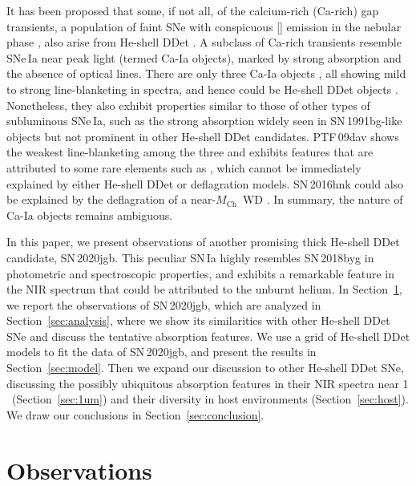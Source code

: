 \documentclass[twocolumn]{aastex631}
\newcommand{\sn}{SN\,2020jgb}
\newcommand{\Mch}{$M_\mathrm{Ch}$}
\begin{document}
It has been proposed that some, if not all, of the calcium-rich (Ca-rich) gap transients, a population of faint SNe with conspicuous [] emission in the nebular phase \citep{Filippenko_2003, Kasliwal_2012}, also arise from He-shell DDet \citep{Dessart_2015,de_Ca_rich_2020,polin_nebular_2021}. A subclass of Ca-rich transients resemble SNe\,Ia near peak light (termed Ca-Ia objects), marked by strong  absorption and the absence of optical  lines. There are only three Ca-Ia objects \citep[PTF\,09dav, SN\,2016hnk, and SN\,2019ofm;][]{de_Ca_rich_2020}, all showing mild to strong line-blanketing in spectra, and hence could be He-shell DDet objects \citep[e.g.,][]{jacobson-galan_16hnk_2020}. Nonetheless, they also exhibit properties similar to those of other types of subluminous SNe\,Ia, such as the strong  absorption widely seen in SN\,1991bg-like \citep[91bg-like;][]{Filippenko_91bg_1992} objects  but not prominent in other He-shell DDet candidates. PTF\,09dav shows the weakest line-blanketing among the three and exhibits features that are attributed to some rare elements such as  \citep{Sullivan_2011}, which cannot be immediately explained by either He-shell DDet or deflagration models. SN\,2016hnk could also be explained by the deflagration of a near-\Mch\ WD \citep{galbany_16hnk_2019}. In summary, the nature of Ca-Ia objects remains ambiguous.

In this paper, we present observations of another promising thick He-shell DDet candidate, \sn. This peculiar SN\,Ia highly resembles SN\,2018byg in photometric and spectroscopic properties, and exhibits a remarkable feature in the NIR spectrum that could be attributed to the unburnt helium. In Section~\ref{sec:obs}, we report the observations of \sn, which are analyzed in Section~\ref{sec:analysis}, where we show its similarities with other He-shell DDet SNe and discuss the tentative  absorption features. We use a grid of He-shell DDet models to fit the data of \sn, and present the results in Section~\ref{sec:model}. Then we expand our discussion to other He-shell DDet SNe, discussing the possibly ubiquitous absorption features in their NIR spectra near 1\,\micron\ (Section~\ref{sec:1um}) and their diversity in host environments (Section~\ref{sec:host}). We draw our conclusions in Section~\ref{sec:conclusion}.

\section{Observations} \label{sec:obs}
\end{document}
